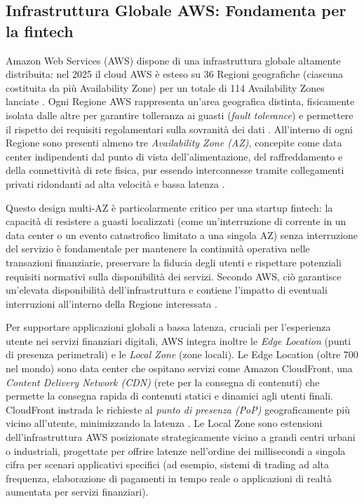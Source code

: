 \subsection{Infrastruttura Globale AWS: Fondamenta per la fintech}
\label{sec:aws-global-infra-fintech}

Amazon Web Services (AWS) dispone di una infrastruttura globale altamente distribuita: nel 2025 il cloud AWS è esteso su 36 Regioni geografiche (ciascuna costituita da più Availability Zone) per un totale di 114 Availability Zones lanciate \cite{aws-global-infra}. Ogni Regione AWS rappresenta un'area geografica distinta, fisicamente isolata dalle altre per garantire tolleranza ai guasti (\textit{fault tolerance}) e permettere il rispetto dei requisiti regolamentari sulla sovranità dei dati \cite{aws-global-infra}. All'interno di ogni Regione sono presenti almeno tre \textit{Availability Zone (AZ)}, concepite come data center indipendenti dal punto di vista dell'alimentazione, del raffreddamento e della connettività di rete fisica, pur essendo interconnesse tramite collegamenti privati ridondanti ad alta velocità e bassa latenza \cite{aws-global-infra}.

Questo design multi-AZ è particolarmente critico per una startup fintech: la capacità di resistere a guasti localizzati (come un'interruzione di corrente in un data center o un evento catastrofico limitato a una singola AZ) senza interruzione del servizio è fondamentale per mantenere la continuità operativa nelle transazioni finanziarie, preservare la fiducia degli utenti e rispettare potenziali requisiti normativi sulla disponibilità dei servizi. Secondo AWS, ciò garantisce un'elevata disponibilità dell'infrastruttura e contiene l'impatto di eventuali interruzioni all'interno della Regione interessata \cite{aws-global-infra}.

Per supportare applicazioni globali a bassa latenza, cruciali per l'esperienza utente nei servizi finanziari digitali, AWS integra inoltre le \textit{Edge Location} (punti di presenza perimetrali) e le \textit{Local Zone} (zone locali). Le Edge Location (oltre 700 nel mondo) sono data center che ospitano servizi come Amazon CloudFront, una \textit{Content Delivery Network (CDN)} (rete per la consegna di contenuti) che permette la consegna rapida di contenuti statici e dinamici agli utenti finali. CloudFront instrada le richieste al \textit{punto di presenza (PoP)} geograficamente più vicino all'utente, minimizzando la latenza \cite{aws-cloudfront}. Le Local Zone sono estensioni dell'infrastruttura AWS posizionate strategicamente vicino a grandi centri urbani o industriali, progettate per offrire latenze nell'ordine dei millisecondi a singola cifra per scenari applicativi specifici (ad esempio, sistemi di trading ad alta frequenza, elaborazione di pagamenti in tempo reale o applicazioni di realtà aumentata per servizi finanziari).

